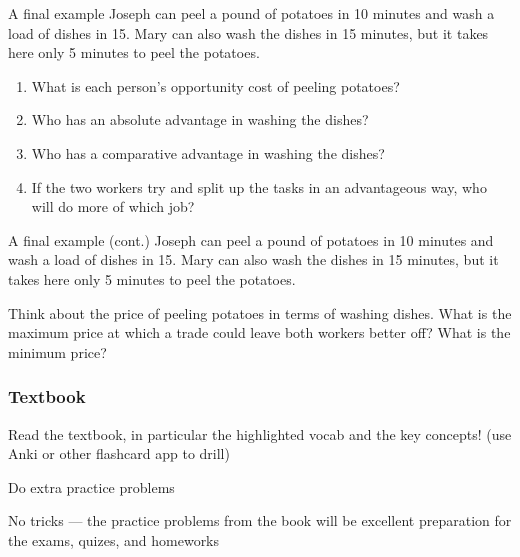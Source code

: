 \documentclass[aspectratio=169]{beamer}
\begin{document}
\begin{frame}{A final example}
    Joseph can peel a pound of potatoes in 10 minutes and wash a load of dishes in 15. Mary can also wash the dishes in 15 minutes, but it takes here only 5 minutes to peel the potatoes. 
    
    \begin{enumerate}
        \item What is each person's opportunity cost of peeling potatoes?
        \item Who has an absolute advantage in washing the dishes?
        \item Who has a comparative advantage in washing the dishes?
        \item If the two workers try and split up the tasks in an advantageous way, who will do more of which job?
    \end{enumerate}

\end{frame}

\begin{frame}{A final example (cont.)}
    Joseph can peel a pound of potatoes in 10 minutes and wash a load of dishes in 15. Mary can also wash the dishes in 15 minutes, but it takes here only 5 minutes to peel the potatoes. 
    
    \medskip

    Think about the price of peeling potatoes in terms of washing dishes. What is the maximum price at which a trade could leave both workers better off? What is the minimum price?

\end{frame}

\begin{frame}
    \frametitle{Textbook}
    Read the textbook, in particular the highlighted vocab and the key concepts! (use Anki or other flashcard app to drill)

    \medskip

    Do extra practice problems
    
    \medskip

    No tricks --- the practice problems from the book will be excellent preparation for the exams, quizes, and homeworks
\end{frame}
\end{document}
